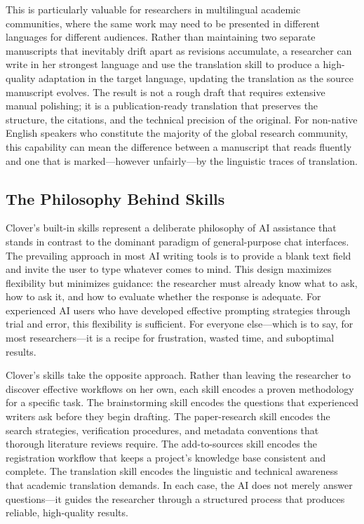 \documentclass[a4paper,11pt]{article}
\begin{document}
This is particularly valuable for researchers in multilingual academic communities, where the same work may need to be presented in different languages for different audiences. Rather than maintaining two separate manuscripts that inevitably drift apart as revisions accumulate, a researcher can write in her strongest language and use the translation skill to produce a high-quality adaptation in the target language, updating the translation as the source manuscript evolves. The result is not a rough draft that requires extensive manual polishing; it is a publication-ready translation that preserves the structure, the citations, and the technical precision of the original. For non-native English speakers who constitute the majority of the global research community, this capability can mean the difference between a manuscript that reads fluently and one that is marked---however unfairly---by the linguistic traces of translation.

\subsection{The Philosophy Behind Skills}

Clover's built-in skills represent a deliberate philosophy of AI assistance that stands in contrast to the dominant paradigm of general-purpose chat interfaces. The prevailing approach in most AI writing tools is to provide a blank text field and invite the user to type whatever comes to mind. This design maximizes flexibility but minimizes guidance: the researcher must already know what to ask, how to ask it, and how to evaluate whether the response is adequate. For experienced AI users who have developed effective prompting strategies through trial and error, this flexibility is sufficient. For everyone else---which is to say, for most researchers---it is a recipe for frustration, wasted time, and suboptimal results.

Clover's skills take the opposite approach. Rather than leaving the researcher to discover effective workflows on her own, each skill encodes a proven methodology for a specific task. The brainstorming skill encodes the questions that experienced writers ask before they begin drafting. The paper-research skill encodes the search strategies, verification procedures, and metadata conventions that thorough literature reviews require. The add-to-sources skill encodes the registration workflow that keeps a project's knowledge base consistent and complete. The translation skill encodes the linguistic and technical awareness that academic translation demands. In each case, the AI does not merely answer questions---it guides the researcher through a structured process that produces reliable, high-quality results.
\end{document}
